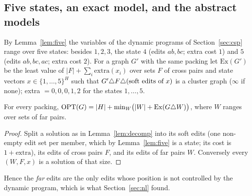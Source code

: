 \subsection{Five states, an exact model, and the abstract models}\label{sec:softmodel}
By Lemma~\ref{lem:five} the variables of the dynamic programs of Section~\ref{sec:csp} range over five states: besides $1,2,3$, the state $4$ (edits $ab,bc$; extra cost $1$) and $5$ (edits $ab,bc,ac$; extra cost $2$). For a graph $G'$ with the same packing let $\mathrm{Ex}(G')$ be the least value of $|F|+\sum_i\mathrm{extra}(x_i)$ over sets $F$ of cross pairs and state vectors $x\in\{1,\dots,5\}^H$ such that $G'\triangle F\triangle(\text{soft edits of }x)$ is a cluster graph ($\infty$ if none); extra $=0,0,0,1,2$ for the states $1,\dots,5$.
\begin{lemma}[Exactness]\label{lem:sfE}
For every packing, $\mathrm{OPT}(G)=|H|+\min_{W}\bigl(|W|+\mathrm{Ex}(G\triangle W)\bigr)$, where $W$ ranges over sets of far pairs.
\end{lemma}
\begin{proof}
Split a solution as in Lemma~\ref{lem:decomp} into its soft edits (one non-empty edit set per member, which by Lemma~\ref{lem:five} is a state; its cost is $1+\mathrm{extra}$), its edits of cross pairs $F$, and its edits of far pairs $W$. Conversely every $(W,F,x)$ is a solution of that size.
\end{proof}
Hence the \emph{far} edits are the only edits whose position is not controlled by the dynamic program, which is what Section~\ref{sec:nl} found.

